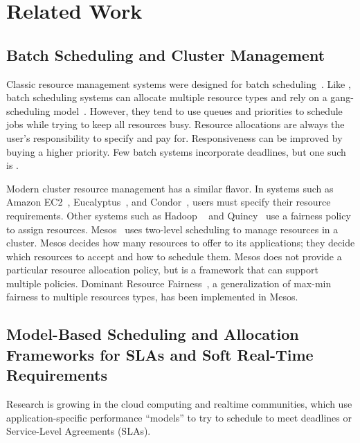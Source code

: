 \section{Related Work}\label{related_work}
\subsection{Batch Scheduling and Cluster Management}
Classic resource management systems were designed for batch scheduling~\cite{Feit97,FRS04}. Like \pacora, batch scheduling systems can allocate multiple resource types and rely on a gang-scheduling model~\cite{FeRu92}.  However, they tend to use queues and priorities to schedule jobs while trying to keep all resources busy. Resource allocations are always the user's responsibility to specify and pay for. Responsiveness can be improved by buying a higher priority. Few batch systems incorporate deadlines, but one such is \cite{AKKMS95}.

Modern cluster resource management has a similar flavor.  In systems such as
Amazon EC2~\cite{EC2}, Eucalyptus~\cite{eucalyptus}, and Condor~\cite{Condor}, users must specify their resource requirements.  Other systems such as Hadoop ~\cite{hadoop_fair, hadoop_cap, hadoop_matei} and Quincy~\cite{Quincy} use a fairness policy to assign resources. Mesos~\cite{mesos} uses two-level scheduling to manage resources in a cluster. Mesos decides how many resources to offer to its applications; they decide which resources to accept and how to schedule them. Mesos does not provide a particular resource allocation policy, but is a framework that can support multiple policies. Dominant Resource Fairness~\cite{mesos-DRF}, a generalization of max-min fairness to multiple resources types, has been implemented in Mesos.

\subsection{Model-Based Scheduling and Allocation Frameworks for SLAs and Soft Real-Time Requirements}

Research is growing in the cloud computing and realtime communities, which use application-specific performance ``models'' to try to schedule to meet deadlines or Service-Level Agreements (SLAs).

